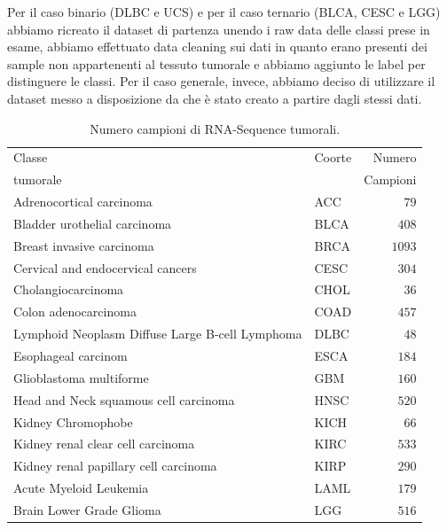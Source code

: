 Per il caso binario (DLBC e UCS) e per il caso ternario (BLCA, CESC e LGG) abbiamo ricreato il dataset di partenza 
unendo i raw data delle classi prese in esame, abbiamo effettuato data cleaning sui dati in quanto erano presenti 
dei sample non appartenenti al tessuto tumorale e abbiamo aggiunto le label per distinguere le classi. 
Per il caso generale, invece, abbiamo deciso di utilizzare il dataset messo a disposizione da \cite{lyu2018deep} 
che è stato creato a partire dagli stessi dati.

\begin{table}[htbp]
    \centering 
    \caption{Numero campioni di RNA-Sequence tumorali.}
    \large{
    \begin{tabular}{llr}
    \toprule
    Classe   & Coorte & Numero    \\
    tumorale &        & Campioni  \\
    \midrule
    Adrenocortical carcinoma                        & ACC  & $79$   \\
    Bladder urothelial carcinoma                    & BLCA & $408$  \\
    Breast invasive carcinoma                       & BRCA & $1093$ \\
    Cervical and endocervical cancers               & CESC & $304$  \\
    Cholangiocarcinoma                              & CHOL & $36$   \\
    Colon adenocarcinoma                            & COAD & $457$  \\
    Lymphoid Neoplasm Diffuse Large B-cell Lymphoma & DLBC & $48$   \\
    Esophageal carcinom                             & ESCA & $184$  \\
    Glioblastoma multiforme                         & GBM  & $160$  \\
    Head and Neck squamous cell carcinoma           & HNSC & $520$  \\
    Kidney Chromophobe                              & KICH & $66$   \\
    Kidney renal clear cell carcinoma               & KIRC & $533$  \\
    Kidney renal papillary cell carcinoma           & KIRP & $290$  \\
    Acute Myeloid Leukemia                          & LAML & $179$  \\
    Brain Lower Grade Glioma                        & LGG  & $516$  \\

\end{tabular}}
\end{table}

